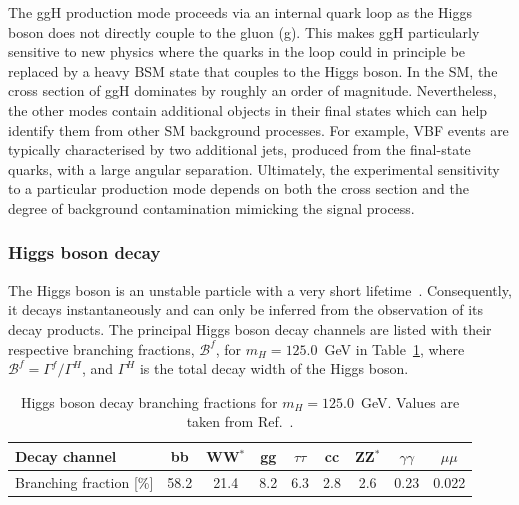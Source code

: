 The ggH production mode proceeds via an internal quark loop as the Higgs boson does not directly couple to the gluon (g). This makes ggH particularly sensitive to new physics where the quarks in the loop could in principle be replaced by a heavy BSM state that couples to the Higgs boson. In the SM, the cross section of ggH dominates by roughly an order of magnitude. Nevertheless, the other modes contain additional objects in their final states which can help identify them from other SM background processes. For example, VBF events are typically characterised by two additional jets, produced from the final-state quarks, with a large angular separation. Ultimately, the experimental sensitivity to a particular production mode depends on both the cross section and the degree of background contamination mimicking the signal process.

\subsubsection{Higgs boson decay}
The Higgs boson is an unstable particle with a very short lifetime~\cite{Zyla:2020zbs}. Consequently, it decays instantaneously and can only be inferred from the observation of its decay products. The principal Higgs boson decay channels are listed with their respective branching fractions, $\mathcal{B}^f$, for $m_H=125.0$~GeV in Table~\ref{tab:higgs_br}, where $\mathcal{B}^f=\Gamma^f/\Gamma^H$, and $\Gamma^H$ is the total decay width of the Higgs boson.

\begin{table}[htb]
    \caption[Higgs boson decay branching fractions]{Higgs boson decay branching fractions for $m_H=125.0$~GeV. Values are taken from Ref.~\cite{deFlorian:2016spz}.}
    \label{tab:higgs_br}
    \centering
    \footnotesize
    \setlength{\tabcolsep}{8pt}
    \renewcommand{\arraystretch}{2}
    \begin{tabular}{l|c|c|c|c|c|c|c|c}
        Decay channel & bb & WW$^{*}$ & gg & $\tau\tau$ & cc & ZZ$^{*}$ & $\gamma\gamma$ & $\mu\mu$   \\ \hline
        Branching fraction [\%] & 58.2 & 21.4 & 8.2 & 6.3 & 2.8 & 2.6 & 0.23 & 0.022  \\
    \end{tabular}
\end{table}

